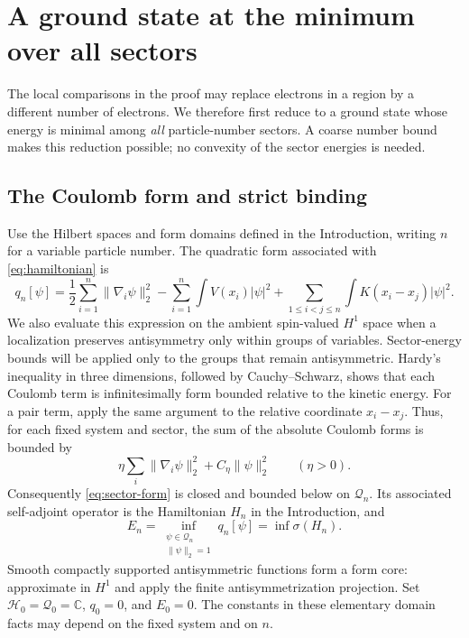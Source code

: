 \section{A ground state at the minimum over all sectors}
\label{sec:sector}\label{sec:foundations}

The local comparisons in the proof may replace electrons in a region by a
different number of electrons.  We therefore first reduce to a ground state
whose energy is minimal among \emph{all} particle-number sectors.  A coarse
number bound makes this reduction possible; no convexity of the sector
energies is needed.

\subsection{The Coulomb form and strict binding}

Use the Hilbert spaces and form domains defined in the Introduction,
writing $n$ for a variable particle number.  The quadratic form associated
with \eqref{eq:hamiltonian} is
\begin{equation}\label{eq:sector-form}
 q_n[\psi]
 =\frac12\sum_{i=1}^n\|\nabla_i\psi\|_2^2
  -\sum_{i=1}^n\int V(x_i)|\psi|^2
  +\sum_{1\leq i<j\leq n}\int K(x_i-x_j)|\psi|^2.
\end{equation}
We also evaluate this expression on the ambient spin-valued $H^1$ space
when a localization preserves antisymmetry only within groups of variables.
Sector-energy bounds will be applied only to the groups that remain
antisymmetric.
Hardy's inequality in three dimensions, followed by Cauchy--Schwarz,
shows that each Coulomb term is infinitesimally form bounded relative to
the kinetic energy.  For a pair term, apply the same argument to the
relative coordinate $x_i-x_j$.  Thus, for each fixed system and sector,
the sum of the absolute Coulomb forms is bounded by
\[
 \eta\sum_i\|\nabla_i\psi\|_2^2+C_\eta\|\psi\|_2^2
 \qquad(\eta>0).
\]
Consequently \eqref{eq:sector-form} is closed and bounded below on
$\mathcal Q_n$.  Its associated self-adjoint operator is the Hamiltonian
$H_n$ in the Introduction, and
\[
 E_n=\inf_{\substack{\psi\in\mathcal Q_n\\\|\psi\|_2=1}}
             q_n[\psi]=\inf\sigma(H_n).
\]
Smooth compactly supported antisymmetric functions form a form core:
approximate in $H^1$ and apply the finite antisymmetrization projection.
Set $\mathcal H_0=\mathcal Q_0=\mathbb C$, $q_0=0$, and $E_0=0$.
The constants in these elementary domain facts may depend on the fixed
system and on $n$.

